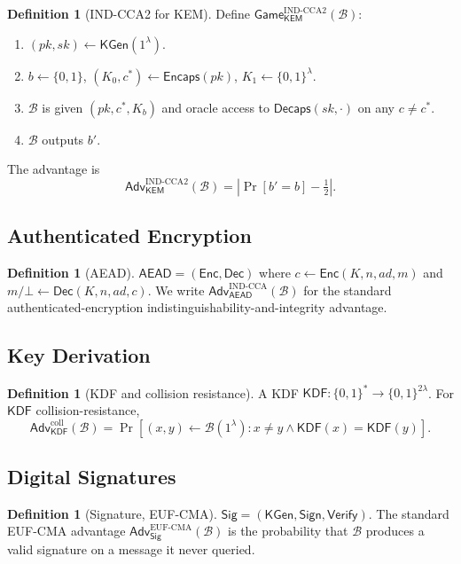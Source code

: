 \documentclass[11pt,a4paper]{article}
\theoremstyle{plain}
\theoremstyle{definition}
\newtheorem{definition}[theorem]{Definition}
\newcommand{\Adv}{\mathsf{Adv}}
\newcommand{\GameG}{\mathsf{Game}}
\newcommand{\KEM}{\mathsf{KEM}}
\newcommand{\KDF}{\mathsf{KDF}}
\newcommand{\AEAD}{\mathsf{AEAD}}
\newcommand{\Sig}{\mathsf{Sig}}
\newcommand{\Verify}{\mathsf{Verify}}
\newcommand{\KeyGen}{\mathsf{KGen}}
\newcommand{\Encaps}{\mathsf{Encaps}}
\newcommand{\Decaps}{\mathsf{Decaps}}
\newcommand{\Enc}{\mathsf{Enc}}
\newcommand{\Dec}{\mathsf{Dec}}
\newcommand{\Sign}{\mathsf{Sign}}
\begin{document}
\begin{definition}[IND-CCA2 for KEM]
\label{def:kemcca}
Define $\GameG_{\KEM}^{\mathrm{IND\text{-}CCA2}}(\mathcal{B})$:
\begin{enumerate}[itemsep=2pt,topsep=2pt]
  \item $(pk, sk) \gets \KeyGen(1^\lambda)$.
  \item $b \gets \{0,1\}$, $(K_0, c^*) \gets \Encaps(pk)$, $K_1 \gets \{0,1\}^\lambda$.
  \item $\mathcal{B}$ is given $(pk, c^*, K_b)$ and oracle access to
        $\Decaps(sk, \cdot)$ on any $c \neq c^*$.
  \item $\mathcal{B}$ outputs $b'$.
\end{enumerate}
The advantage is
\[
\Adv_{\KEM}^{\mathrm{IND\text{-}CCA2}}(\mathcal{B}) = \left| \Pr[b' = b] - \tfrac12 \right|.
\]
\end{definition}

\subsection{Authenticated Encryption}

\begin{definition}[AEAD]
$\AEAD = (\Enc, \Dec)$ where $c \gets \Enc(K, n, ad, m)$ and
$m / \bot \gets \Dec(K, n, ad, c)$. We write
$\Adv_\AEAD^{\mathrm{IND\text{-}CCA}}(\mathcal{B})$ for the standard
authenticated-encryption indistinguishability-and-integrity advantage.
\end{definition}

\subsection{Key Derivation}

\begin{definition}[KDF and collision resistance]
A KDF $\KDF: \{0,1\}^* \to \{0,1\}^{2\lambda}$. For $\KDF$
collision-resistance,
\[
\Adv_\KDF^{\mathrm{coll}}(\mathcal{B}) = \Pr[(x,y) \gets \mathcal{B}(1^\lambda) : x \neq y \wedge \KDF(x) = \KDF(y)].
\]
\end{definition}

\subsection{Digital Signatures}

\begin{definition}[Signature, EUF-CMA]
$\Sig = (\KeyGen, \Sign, \Verify)$. The standard EUF-CMA advantage
$\Adv_\Sig^{\mathrm{EUF\text{-}CMA}}(\mathcal{B})$ is the probability that
$\mathcal{B}$ produces a valid signature on a message it never queried.
\end{definition}
\end{document}
